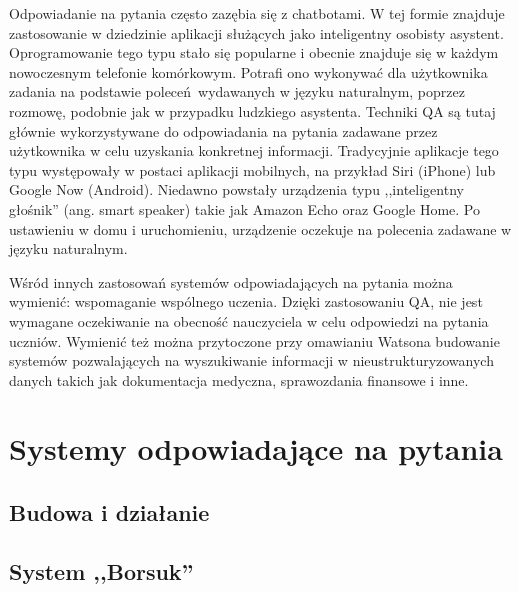\documentclass[a4paper, twoside, 12pt]{report}
\begin{document}
            Odpowiadanie na pytania często zazębia się z chatbotami. W tej formie znajduje zastosowanie w dziedzinie
            aplikacji służących jako inteligentny
            osobisty asystent. Oprogramowanie tego typu stało się popularne i obecnie znajduje się w każdym nowoczesnym
            telefonie komórkowym. Potrafi ono wykonywać dla użytkownika zadania na podstawie poleceń wydawanych w języku
            naturalnym, poprzez rozmowę, podobnie jak w przypadku ludzkiego asystenta. Techniki QA są tutaj głównie
            wykorzystywane do odpowiadania na pytania zadawane przez użytkownika w celu uzyskania konkretnej informacji.
            Tradycyjnie aplikacje tego typu występowały w postaci aplikacji mobilnych, na przykład Siri (iPhone) lub
            Google Now (Android). Niedawno powstały urządzenia typu ,,inteligentny głośnik'' (ang. smart speaker) takie
            jak Amazon Echo oraz Google Home. Po ustawieniu w domu i uruchomieniu, urządzenie oczekuje na polecenia
            zadawane w języku naturalnym.

            Wśród innych zastosowań systemów odpowiadających na pytania można wymienić: wspomaganie wspólnego
            uczenia\cite{COLLABORATIVELEARNING}. Dzięki zastosowaniu QA, nie jest wymagane oczekiwanie na obecność nauczyciela
            w celu odpowiedzi na pytania uczniów. Wymienić też można przytoczone przy omawianiu Watsona budowanie systemów
            pozwalających na wyszukiwanie informacji w nieustrukturyzowanych danych takich jak dokumentacja medyczna,
            sprawozdania finansowe i inne.
\chapter{Systemy odpowiadające na pytania}
    \section{Budowa i działanie}
    \section{System ,,Borsuk''}

\clearpage
{}


\end{document}

